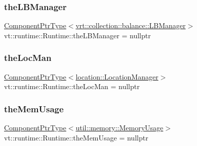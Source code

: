 \subsubsection{\texorpdfstring{the\+L\+B\+Manager}{theLBManager}}
{\footnotesize\ttfamily \hyperlink{structvt_1_1runtime_1_1_runtime_a0893bf0a8c03b898e8ab66b52cec80ad}{Component\+Ptr\+Type}$<$\hyperlink{structvt_1_1vrt_1_1collection_1_1balance_1_1_l_b_manager}{vrt\+::collection\+::balance\+::\+L\+B\+Manager}$>$ vt\+::runtime\+::\+Runtime\+::the\+L\+B\+Manager = nullptr}

\mbox{\label{structvt_1_1runtime_1_1_runtime_ae198134b20e8c3787f16f4e790f95d9a}} 
\subsubsection{\texorpdfstring{the\+Loc\+Man}{theLocMan}}
{\footnotesize\ttfamily \hyperlink{structvt_1_1runtime_1_1_runtime_a0893bf0a8c03b898e8ab66b52cec80ad}{Component\+Ptr\+Type}$<$\hyperlink{structvt_1_1location_1_1_location_manager}{location\+::\+Location\+Manager}$>$ vt\+::runtime\+::\+Runtime\+::the\+Loc\+Man = nullptr}

\mbox{\label{structvt_1_1runtime_1_1_runtime_a99d9a28de0742915ca6b25393807dd8b}} 
\subsubsection{\texorpdfstring{the\+Mem\+Usage}{theMemUsage}}
{\footnotesize\ttfamily \hyperlink{structvt_1_1runtime_1_1_runtime_a0893bf0a8c03b898e8ab66b52cec80ad}{Component\+Ptr\+Type}$<$\hyperlink{structvt_1_1util_1_1memory_1_1_memory_usage}{util\+::memory\+::\+Memory\+Usage}$>$ vt\+::runtime\+::\+Runtime\+::the\+Mem\+Usage = nullptr}

\mbox{\label{structvt_1_1runtime_1_1_runtime_a8aad5f2fdd05ddd81995f5af94ce196e}} 
